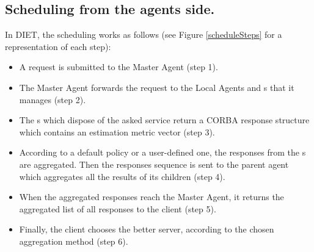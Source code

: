 \subsection{Scheduling from the agents side.}
In DIET, the scheduling works as follows (see Figure \ref{scheduleSteps} for
a representation of each step): 
\begin{itemize}
  \item A request is submitted to the Master Agent (step 1).
  \item The Master Agent forwards the request to the Local Agents and {\sed}s that
    it manages (step 2).
  \item The {\sed}s which dispose of the asked service return a CORBA response
    structure which contains an estimation metric vector (step 3).
  \item According to a default policy or a user-defined one, the responses
    from the {\sed}s are aggregated. Then the responses sequence is sent to
    the parent agent which aggregates all the results of its children (step 4).
  \item When the aggregated responses reach the Master Agent, it returns
    the aggregated list of all responses to the client (step 5).
  \item Finally, the client chooses the better server, according to the
    chosen aggregation method (step 6).
\end{itemize}
\newlength{\schdlFigWidth}
\setlength{\schdlFigWidth}{(\textwidth - 3mm) / 3}
